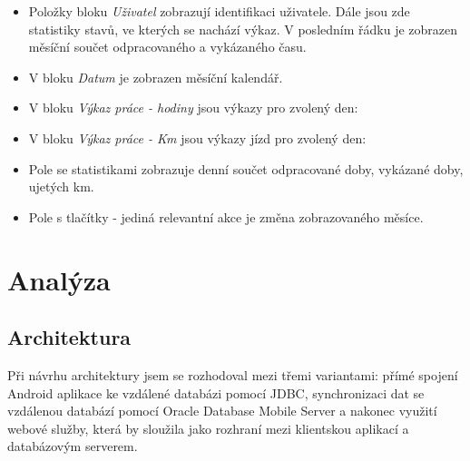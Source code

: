 \documentclass{diplomka}
\begin{document}
\begin{itemize}[noitemsep,nolistsep]
\item Položky bloku \emph{Uživatel} zobrazují identifikaci uživatele. Dále jsou zde statistiky stavů, ve kterých se nachází výkaz. V posledním řádku je zobrazen měsíční součet odpracovaného a vykázaného času.
\item V bloku \emph{Datum} je zobrazen měsíční kalendář.
\item V bloku \emph{Výkaz práce - hodiny} jsou výkazy pro zvolený den:
\item V bloku \emph{Výkaz práce - Km} jsou výkazy jízd pro zvolený den:
\item Pole se statistikami zobrazuje denní součet odpracované doby, vykázané doby, ujetých km. 
\item Pole s tlačítky - jediná relevantní akce je změna zobrazovaného měsíce.
\end{itemize}

\chapter{Analýza}

\section{Architektura}
Při návrhu architektury jsem se rozhodoval mezi třemi variantami: přímé spojení Android aplikace ke vzdálené databázi pomocí JDBC, synchronizaci dat se vzdálenou databází pomocí Oracle Database Mobile Server a nakonec využití webové služby, která by sloužila jako rozhraní mezi klientskou aplikací a databázovým serverem.
\end{document}
